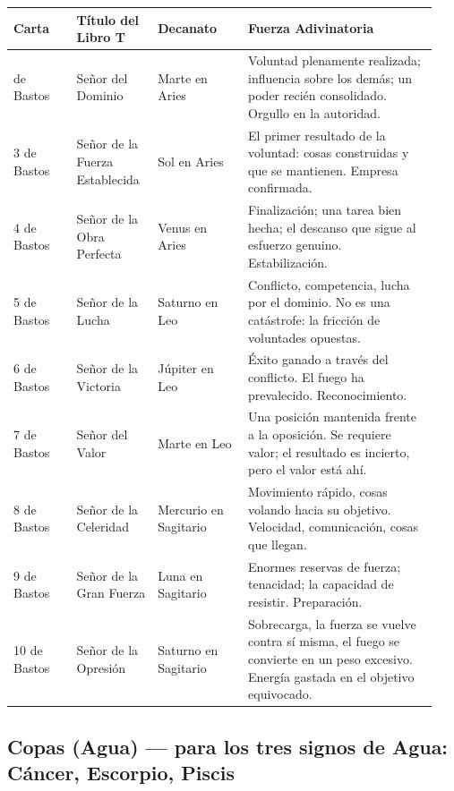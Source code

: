 \begin{longtable}[]{@{}>{\RaggedRight\small}p{0.14\linewidth}>{\RaggedRight\small}p{0.18\linewidth}>{\RaggedRight\small}p{0.20\linewidth}>{\RaggedRight\small}p{0.42\linewidth}@{}}
\toprule\noalign{}
Carta & Título del Libro T & Decanato & Fuerza Adivinatoria \\
\midrule\noalign{}
\endhead
\bottomrule\noalign{}
\endlastfoot
2 de Bastos & Señor del Dominio & Marte en Aries & Voluntad plenamente realizada; influencia sobre los demás; un poder recién consolidado. Orgullo en la autoridad. \\
3 de Bastos & Señor de la Fuerza Establecida & Sol en Aries & El primer resultado de la voluntad: cosas construidas y que se mantienen. Empresa confirmada. \\
4 de Bastos & Señor de la Obra Perfecta & Venus en Aries & Finalización; una tarea bien hecha; el descanso que sigue al esfuerzo genuino. Estabilización. \\
5 de Bastos & Señor de la Lucha & Saturno en Leo & Conflicto, competencia, lucha por el dominio. No es una catástrofe: la fricción de voluntades opuestas. \\
6 de Bastos & Señor de la Victoria & Júpiter en Leo & Éxito ganado a través del conflicto. El fuego ha prevalecido. Reconocimiento. \\
7 de Bastos & Señor del Valor & Marte en Leo & Una posición mantenida frente a la oposición. Se requiere valor; el resultado es incierto, pero el valor está ahí. \\
8 de Bastos & Señor de la Celeridad & Mercurio en Sagitario & Movimiento rápido, cosas volando hacia su objetivo. Velocidad, comunicación, cosas que llegan. \\
9 de Bastos & Señor de la Gran Fuerza & Luna en Sagitario & Enormes reservas de fuerza; tenacidad; la capacidad de resistir. Preparación. \\
10 de Bastos & Señor de la Opresión & Saturno en Sagitario & Sobrecarga, la fuerza se vuelve contra sí misma, el fuego se convierte en un peso excesivo. Energía gastada en el objetivo equivocado. \\
\end{longtable}

\subsection{Copas (Agua) --- para los tres signos de Agua: Cáncer, Escorpio, Piscis}\label{cups-water--suits-the-three-water-signs-cancer-scorpio-pisces}


